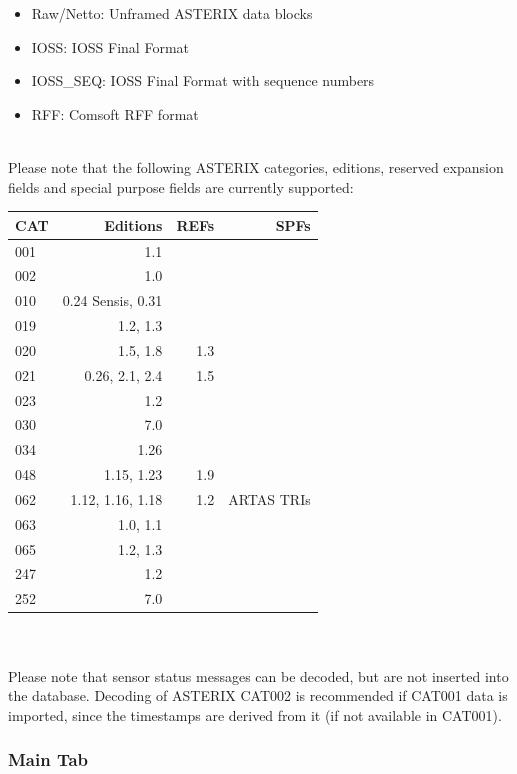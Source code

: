 \begin{itemize}
\item Raw/Netto: Unframed ASTERIX data blocks
\item IOSS: IOSS Final Format
\item IOSS\_SEQ: IOSS Final Format with sequence numbers
\item RFF: Comsoft RFF format
\end{itemize}
\ \\

Please note that the following ASTERIX categories, editions, reserved expansion fields and special purpose fields are currently supported: \\

\begin{tabular}{ | l | r | r | r |}
\hline
  CAT & Editions & REFs & SPFs  \\ \hline
  001 & 1.1 &  &  \\ \hline
  002 & 1.0 &  &  \\ \hline
  010 & 0.24 Sensis, 0.31  &  &  \\ \hline
  019 & 1.2, 1.3 & & \\ \hline
  020 & 1.5, 1.8 & 1.3 & \\ \hline
  021 & 0.26, 2.1, 2.4 & 1.5 & \\ \hline
  023 & 1.2 & & \\ \hline
  030 & 7.0 & & \\ \hline
  034 & 1.26 & & \\ \hline
  048 & 1.15, 1.23 & 1.9 & \\ \hline
  062 & 1.12, 1.16, 1.18 & 1.2 & ARTAS TRIs \\ \hline
  063 & 1.0, 1.1 & & \\ \hline
  065 & 1.2, 1.3 & & \\ \hline
  247 & 1.2 & & \\ \hline
  252 & 7.0 & & \\ \hline
\end{tabular} \\
\  \\

Please note that sensor status messages can be decoded, but are not inserted into the database. 
Decoding of ASTERIX CAT002 is recommended if CAT001 data is imported, since the timestamps are derived from it (if not available in CAT001).

\subsubsection{Main Tab}

